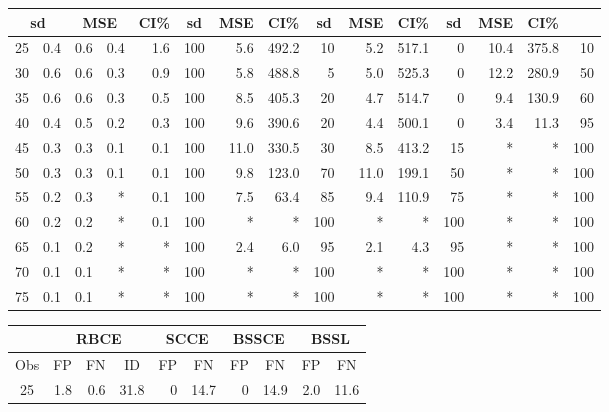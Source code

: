 \documentclass[preprint,12pt]{elsarticle}
\begin{document}
\begin{table}[ht]
\begin{tabular}{c|rrrrr|rrr|rrr|rrr}
		\multicolumn{2}{c}{sd}&
		\multicolumn{2}{c}{MSE}&
		\multicolumn{1}{c|}{CI\%}&
		\multicolumn{1}{c}{sd}&
		\multicolumn{1}{c}{MSE}&
		\multicolumn{1}{c|}{CI\%}&
		\multicolumn{1}{c}{sd}&
		\multicolumn{1}{c}{MSE}&
		\multicolumn{1}{c|}{CI\%}&
		\multicolumn{1}{c}{sd}&
		\multicolumn{1}{c}{MSE}&
		\multicolumn{1}{c}{CI\%}
		\\
		\hline
		25 & 0.4 & 0.6 & 0.4 & 1.6 & 100 & 5.6 & 492.2 & 10 & 5.2 & 517.1 & 0 & 10.4 & 375.8 & 10 \\ 
		30 & 0.6 & 0.6 & 0.3 & 0.9 & 100 & 5.8 & 488.8 & 5 & 5.0 & 525.3 & 0 & 12.2 & 280.9 & 50 \\ 
		35 & 0.6 & 0.6 & 0.3 & 0.5 & 100 & 8.5 & 405.3 & 20 & 4.7 & 514.7 & 0 & 9.4 & 130.9 & 60 \\ 
		40 & 0.4 & 0.5 & 0.2 & 0.3 & 100 & 9.6 & 390.6 & 20 & 4.4 & 500.1 & 0 & 3.4 & 11.3 & 95 \\ 
		45 & 0.3 & 0.3 & 0.1 & 0.1 & 100 & 11.0 & 330.5 & 30 & 8.5 & 413.2 & 15 & * & * & 100 \\ 
		50 & 0.3 & 0.3 & 0.1 & 0.1 & 100 & 9.8 & 123.0 & 70 & 11.0 & 199.1 & 50 & * & * & 100 \\ 
		55 & 0.2 & 0.3 & * & 0.1 & 100 & 7.5 & 63.4 & 85 & 9.4 & 110.9 & 75 & * & * & 100 \\ 
		60 & 0.2 & 0.2 & * & 0.1 & 100 & * & * & 100 & * & * & 100 & * & * & 100 \\ 
		65 & 0.1 & 0.2 & * & * & 100 & 2.4 & 6.0 & 95 & 2.1 & 4.3 & 95 & * & * & 100 \\ 
		70 & 0.1 & 0.1 & * & * & 100 & * & * & 100 & * & * & 100 & * & * & 100 \\ 
		75 & 0.1 & 0.1 & * & * & 100 & * & * & 100 & * & * & 100 & * & * & 100 \\ 
		\hline
	\end{tabular}
	\begin{tabular}{c|rrr|rr|rr|rr}
		\hline
		\multicolumn{1}{l|}{}&
		\multicolumn{3}{c|}{RBCE}&
		\multicolumn{2}{c|}{SCCE}&
		\multicolumn{2}{c|}{BSSCE}&
		\multicolumn{2}{c}{BSSL}\\
		\hline
		\multicolumn{1}{c|}{Obs}&
		\multicolumn{1}{c}{FP}&
		\multicolumn{1}{c}{FN}&
		\multicolumn{1}{c|}{ID}&
		\multicolumn{1}{c}{FP}&
		\multicolumn{1}{c|}{FN}&
		\multicolumn{1}{c}{FP}&
		\multicolumn{1}{c|}{FN}&
		\multicolumn{1}{c}{FP}&
		\multicolumn{1}{c}{FN}
		\\
		\hline
		25 & 1.8 & 0.6 & 31.8 & 0 & 14.7 & 0 & 14.9 & 2.0 & 11.6 \\ 

\end{tabular}
\end{table}
\end{document}
